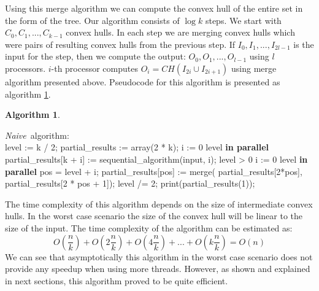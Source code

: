 \documentclass[letterpaper]{article}
\theoremstyle{definition}
\newtheorem{algorithm}{Algorithm}
\begin{document}
Using this merge algorithm we can compute the convex hull of the entire set in the form of the tree.
Our algorithm consists of $\log k$ steps.
We start with $C_0, C_1, ..., C_{k-1}$ convex hulls.
In each step we are merging convex hulls which were pairs of resulting convex hulls from the previous step. 
If $I_0, I_1, ..., I_{2l - 1}$ is the input for the step, then we compute the output: $O_0, O_1, ..., O_{l - 1}$ using $l$ processors. 
$i$-th processor computes $O_i = CH(I_{2i} \cup I_{2i+1})$ using merge algorithm presented above.
Pseudocode for this algorithm is presented as algorithm \ref{alg:naive-parallel}.

\begin{algorithm}
\label{alg:naive-parallel}
\begin{program}
\mbox{{\it Naive} algorithm:}
\BEGIN \\ %
  level := k / 2;
  partial\_results := array(2 * k);
  \FOR i := 0 \TO level  \textrm{\bf{\;in parallel}} \DO
    partial\_results[k + i] := 
    \;\;\;\; sequential\_algorithm(input, i);
  \OD
  \WHILE level > 0 \DO
    \FOR i := 0 \TO level  \textrm{\bf{\;in parallel}} \DO
      pos = level + i;
      partial\_results[pos] := merge(
      \;\;\;\; partial\_results[2*pos],
      \;\;\;\; partial\_results[2 * pos + 1]);
    \OD
    level /= 2;
  \OD
  print(partial\_results(1));

\END
\end{program}
\end{algorithm}

The time complexity of this algorithm depends on the size of intermediate convex hulls.
In the worst case scenario the size of the convex hull will be linear to the size of the input.
The time complexity of the algorithm can be estimated as:
$$O(\frac{n}{k}) + O(2\frac{n}{k}) + O(4\frac{n}{k}) + ... + O(k\frac{n}{k}) = O(n)$$
We can see that asymptotically this algorithm in the worst case scenario does not provide any speedup when using more threads.
However, as shown and explained in next sections, this algorithm proved to be quite efficient.
\end{document}
